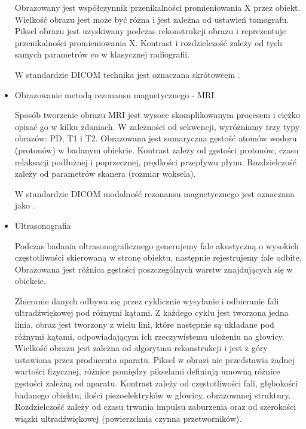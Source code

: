 \begin{itemize}
          Obrazowany jest współczynnik przenikalności promieniowania X przez obiekt.
          Wielkość obrazu jest może być różna i jest zależna od ustawień tomografu.
          Piksel obrazu jest uzyskiwany podczas rekonstrukcji obrazu i reprezentuje przenikalności promieniowania X.
          Kontrast i rozdzielczość zależy od tych samych parametrów co w klasycznej radiografii.

          W standardzie DICOM technika jest oznaczana skrótowcem .

    \item Obrazowanie metodą rezonansu magnetycznego - MRI

          Sposób tworzenie obrazu MRI jest wysoce skomplikowanym procesem i ciężko opisać go w kilku zdaniach.
          W zależności od sekwencji, wyróżniamy trzy typy obrazów: PD, T1 i T2.
          Obrazowana jest sumaryczna gęstość atomów wodoru (protonów) w badanym obiekcie.
          Kontrast zależy od gęstości protonów, czasu relaksacji podłużnej i poprzecznej, prędkości przepływu płynu.
          Rozdzielczość zależy od parametrów skanera (rozmiar woksela).

          W standardzie DICOM modalność rezonansu magnetycznego jest oznaczana jako .

    \item Ultrasonografia

          Podczas badania ultrasonograficznego generujemy fale akustyczną o wysokich częstotliwości skierowaną w stronę obiektu, następnie rejestrujemy fale odbite.
          Obrazowana jest różnica gęstości poszczególnych warstw znajdujących się w obiekcie.

          Zbieranie danych odbywa się przez cyklicznie wysyłanie i odbieranie fali ultradźwiękowej pod różnymi kątami.
          Z każdego cyklu jest tworzona jedna linia, obraz jest tworzony z wielu lini, które następnie są układane pod różnymi kątami, odpowiadającym ich rzeczywistemu ułożeniu na głowicy.
          Wielkość obrazu jest zależna od algorytmu rekonstrukcji i jest z góry ustawiona przez producenta aparatu.
          Piksel w obrazi nie przedstawia żadnej wartości fizycznej, różnice pomiędzy pikselami definiują umowną różnice gęstości zależną od aparatu.
          Kontrast zależy od częstotliwości fali, głębokości badanego obiektu, ilości piezoelektryków w głowicy, obrazowanej struktury.
          Rozdzielczość zależy od czasu trwania impulsu zaburzenia oraz od szerokości wiązki ultradźwiękowej (powierzchnia czynna przetworników).


\end{itemize}
